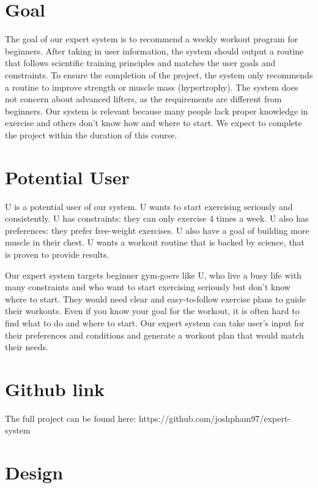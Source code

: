 \documentclass{article}      %
\begin{document}
\section{Goal}

The goal of our expert system is to recommend a weekly workout program for beginners. After taking in user information, the system should output a routine that follows scientific training principles and matches the user goals and constraints. To ensure the completion of the project, the system only recommends a routine to improve strength or muscle mass (hypertrophy). The system does not concern about advanced lifters, as the requirements are different from beginners. Our system is relevant because many people lack proper knowledge in exercise and others don't know how and where to start. We expect to complete the project within the duration of this course.

\section{Potential User}

U is a potential user of our system. U wants to start exercising seriously and consistently. U has constraints: they can only exercise 4 times a week. U also has preferences: they prefer free-weight exercises. U also have a goal of building more muscle in their chest. U wants a workout routine that is backed by science, that is proven to provide results.

Our expert system targets beginner gym-goers like U, who live a busy life with many constraints and who want to start exercising seriously but don't know where to start. They would need clear and easy-to-follow exercise plans to guide their workouts. Even if you know your goal for the workout, it is often hard to find what to do and where to start.  Our expert system can take user's input for their preferences and conditions and generate a workout plan that would match their needs.

\section{Github link}

The full project can be found here: https://github.com/joshpham97/expert-system

\section{Design}
\end{document}
